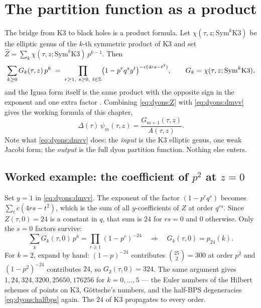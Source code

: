 \section{The partition function as a product}\label{sec:dyons:product}

The bridge from K3 to black holes is a product formula. Let $\chi(\tau,z;\mathrm{Sym}^k\mathrm{K3})$
be the elliptic genus of the $k$-th symmetric product of K3 and set
$\widehat Z=\sum_k\chi(\tau,z;\mathrm{Sym}^{k}\mathrm{K3})\,p^{k-1}$. Then
\begin{equation}\label{eq:dyons:dmvv}
  \sum_{k\ge0}G_k(\tau,z)\,p^{k}
  \;=\;\prod_{\substack{r\ge1,\ s\ge0,\ t\in\Z}}\bigl(1-p^{r}q^{s}y^{t}\bigr)^{-c(4rs-t^2)},
  \qquad G_k=\chi(\tau,z;\mathrm{Sym}^{k}\mathrm{K3}),
\end{equation}
and the Igusa form itself is the same product with the opposite sign in the exponent and one
extra factor . Combining \eqref{eq:dyons:Z} with
\eqref{eq:dyons:dmvv} gives the working formula of this chapter,
\begin{equation}\label{eq:dyons:psiG}
  \Delta(\tau)\,\psi_m(\tau,z)=\frac{G_{m+1}(\tau,z)}{A(\tau,z)} .
\end{equation}
Note what \eqref{eq:dyons:dmvv} does: the \emph{input} is the K3 elliptic genus, one weak
Jacobi form; the \emph{output} is the full dyon partition function. Nothing else enters.

\subsection*{Worked example: the coefficient of \texorpdfstring{$p^2$}{p2} at $z=0$}

Set $y=1$ in \eqref{eq:dyons:dmvv}. The exponent of the factor $(1-p^rq^s)$ becomes
$\sum_t c(4rs-t^2)$, which is the sum of all $y$-coefficients of $Z$ at order $q^{rs}$. Since
$Z(\tau,0)=24$ is a constant in $q$, that sum is $24$ for $rs=0$ and $0$ otherwise. Only the
$s=0$ factors survive:
\begin{equation}\label{eq:dyons:goettsche}
  \sum_k G_k(\tau,0)\,p^k=\prod_{r\ge1}(1-p^r)^{-24}
  \quad\Longrightarrow\quad G_k(\tau,0)=p_{24}(k).
\end{equation}
For $k=2$, expand by hand: $(1-p)^{-24}$ contributes $\binom{25}{2}=300$ at order $p^2$ and
$(1-p^2)^{-24}$ contributes $24$, so $G_2(\tau,0)=324$. The same argument gives
$1,24,324,3200,25650,176256$ for $k=0,\dots,5$ --- the Euler numbers of the Hilbert schemes of
points on K3, Göttsche's numbers, and the half-BPS degeneracies
\eqref{eq:dyons:halfbps} again. The $24$ of K3 propagates to every order.


